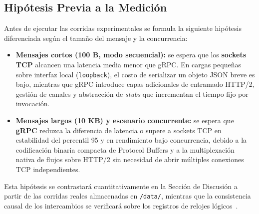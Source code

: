 \subsection{Hipótesis Previa a la Medición}
Antes de ejecutar las corridas experimentales se formula la siguiente hipótesis diferenciada según el tamaño del mensaje y la concurrencia:
\begin{itemize}
  \item \textbf{Mensajes cortos (100 B, modo secuencial):} se espera que los \textbf{sockets TCP} alcancen una latencia media menor que gRPC. En cargas pequeñas sobre interfaz local (\texttt{loopback}), el costo de serializar un objeto JSON breve es bajo, mientras que gRPC introduce capas adicionales de entramado HTTP/2, gestión de canales y abstracción de \emph{stubs} que incrementan el tiempo fijo por invocación.
  \item \textbf{Mensajes largos (10 KB) y escenario concurrente:} se espera que \textbf{gRPC} reduzca la diferencia de latencia o supere a sockets TCP en estabilidad del percentil 95 y en rendimiento bajo concurrencia, debido a la codificación binaria compacta de Protocol Buffers y a la multiplexación nativa de flujos sobre HTTP/2 sin necesidad de abrir múltiples conexiones TCP independientes.
\end{itemize}
Esta hipótesis se contrastará cuantitativamente en la Sección de Discusión a partir de las corridas reales almacenadas en \texttt{/data/}, mientras que la consistencia causal de los intercambios se verificará sobre los registros de relojes lógicos~\cite{castello2024inductive,mathur2022treeclock}.
